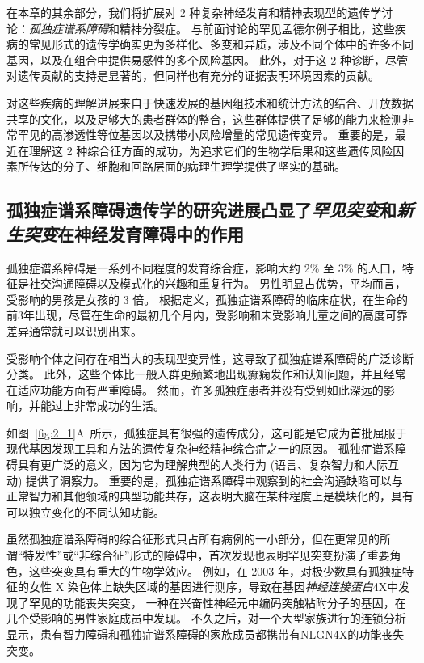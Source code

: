 在本章的其余部分，我们将扩展对 2 种复杂神经发育和精神表现型的遗传学讨论：\textit{孤独症谱系障碍}和精神分裂症。
与前面讨论的罕见孟德尔例子相比，这些疾病的常见形式的遗传学确实更为多样化、多变和异质，涉及不同个体中的许多不同基因，以及在组合中提供易感性的多个风险基因。
此外，对于这 2 种诊断，尽管对遗传贡献的支持是显著的，但同样也有充分的证据表明环境因素的贡献。


对这些疾病的理解进展来自于快速发展的基因组技术和统计方法的结合、开放数据共享的文化，以及足够大的患者群体的整合，这些群体提供了足够的能力来检测非常罕见的高渗透性等位基因以及携带小风险增量的常见遗传变异。
重要的是，最近在理解这 2 种综合征方面的成功，为追求它们的生物学后果和这些遗传风险因素所传达的分子、细胞和回路层面的病理生理学提供了坚实的基础。



\subsection{孤独症谱系障碍遗传学的研究进展凸显了\textit{罕见突变}和\textit{新生突变}在神经发育障碍中的作用}

孤独症谱系障碍是一系列不同程度的发育综合症，影响大约 2\% 至 3\% 的人口，特征是社交沟通障碍以及模式化的兴趣和重复行为。
男性明显占优势，平均而言，受影响的男孩是女孩的 3 倍。
根据定义，孤独症谱系障碍的临床症状，在生命的前3年出现，尽管在生命的最初几个月内，受影响和未受影响儿童之间的高度可靠差异通常就可以识别出来。


受影响个体之间存在相当大的表现型变异性，这导致了孤独症谱系障碍的广泛诊断分类。
此外，这些个体比一般人群更频繁地出现癫痫发作和认知问题，并且经常在适应功能方面有严重障碍。
然而，许多孤独症患者并没有受到如此深远的影响，并能过上非常成功的生活。


如图~\ref{fig:2_1}A~所示，孤独症具有很强的遗传成分，这可能是它成为首批屈服于现代基因发现工具和方法的遗传复杂神经精神综合症之一的原因。
孤独症谱系障碍具有更广泛的意义，因为它为理解典型的人类行为 (语言、复杂智力和人际互动) 提供了洞察力。
重要的是，孤独症谱系障碍中观察到的社会沟通缺陷可以与正常智力和其他领域的典型功能共存，这表明大脑在某种程度上是模块化的，具有可以独立变化的不同认知功能。


虽然孤独症谱系障碍的综合征形式只占所有病例的一小部分，但在更常见的所谓“特发性”或“非综合征”形式的障碍中，首次发现也表明罕见突变扮演了重要角色，这些突变具有重大的生物学效应。
例如，在 2003 年，对极少数具有孤独症特征的女性 X 染色体上缺失区域的基因进行测序，导致在基因\textit{神经连接蛋白}4X中发现了罕见的功能丧失突变， 一种在兴奋性神经元中编码突触粘附分子的基因，在几个受影响的男性家庭成员中发现。
不久之后，对一个大型家族进行的连锁分析显示，患有智力障碍和孤独症谱系障碍的家族成员都携带有NLGN4X的功能丧失突变。



